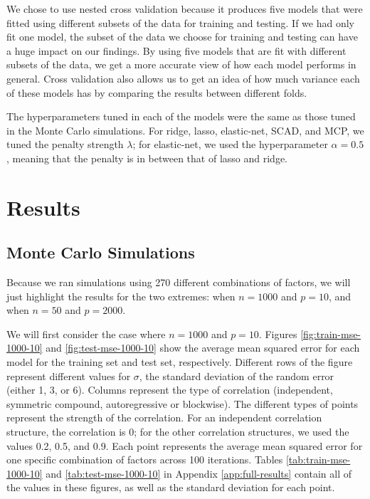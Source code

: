 \documentclass{article}
\begin{document}
We chose to use nested cross validation because it produces five models that were fitted using different subsets of the data for training and testing. If we had only fit one model, the subset of the data we choose for training and testing can have a huge impact on our findings. By using five models that are fit with different subsets of the data, we get a more accurate view of how each model performs in general. Cross validation also allows us to get an idea of how much variance each of these models has by comparing the results between different folds.

The hyperparameters tuned in each of the models were the same as those tuned in the Monte Carlo simulations. For ridge, lasso, elastic-net, SCAD, and MCP, we tuned the penalty strength $\lambda$; for elastic-net, we used the hyperparameter $\alpha = 0.5$, meaning that the penalty is in between that of lasso and ridge. 
\section{Results}



\subsection{Monte Carlo Simulations}

Because we ran simulations using 270 different combinations of factors, we will just highlight the results for the two extremes: when $n = 1000$ and $p = 10$, and when $n = 50$ and $p = 2000$.

We will first consider the case where $n = 1000$ and $p = 10$. Figures \ref{fig:train-mse-1000-10} and \ref{fig:test-mse-1000-10} show the average mean squared error for each model for the training set and test set, respectively. Different rows of the figure represent different values for $\sigma$, the standard deviation of the random error (either 1, 3, or 6). Columns represent the type of correlation (independent, symmetric compound, autoregressive or blockwise). The different types of points represent the strength of the correlation. For an independent correlation structure, the correlation is 0; for the other correlation structures, we used the values 0.2, 0.5, and 0.9. Each point represents the average mean squared error for one specific combination of factors across 100 iterations. Tables \ref{tab:train-mse-1000-10} and \ref{tab:test-mse-1000-10} in Appendix \ref{app:full-results} contain all of the values in these figures, as well as the standard deviation for each point.
\end{document}
